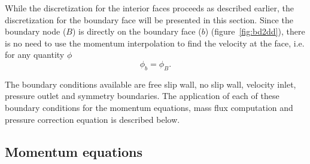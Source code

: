 While the discretization for the interior faces proceeds as described earlier, the discretization for the boundary face will be presented in this section. Since the boundary node ($B$) is directly on the boundary face ($b$) (figure~\ref{fig:bd2dd}), there is no need to use the momentum interpolation to find the velocity at the face, i.e. for any quantity $\phi$
\begin{equation}
\phi_b = \phi_B.
\end{equation}

The boundary conditions available are free slip wall, no slip wall, velocity inlet, pressure outlet and symmetry boundaries. The application of each of these boundary conditions for the momentum equations, mass flux computation and pressure correction equation is described below.
\subsection{Momentum equations}
